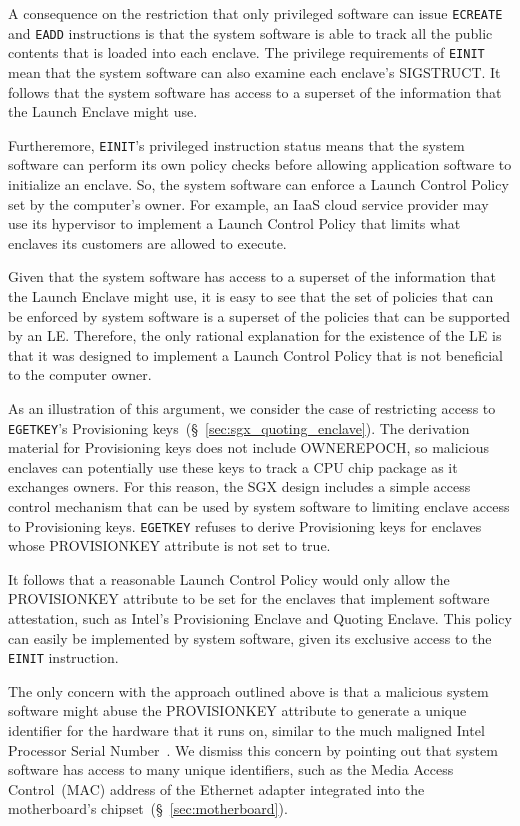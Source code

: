 A consequence on the restriction that only privileged software can issue
\texttt{ECREATE} and \texttt{EADD} instructions is that the system software is
able to track all the public contents that is loaded into each enclave. The
privilege requirements of \texttt{EINIT} mean that the system software can also
examine each enclave's SIGSTRUCT. It follows that the system software has
access to a superset of the information that the Launch Enclave might use.

Furtheremore, \texttt{EINIT}'s privileged instruction status means that the
system software can perform its own policy checks before allowing application
software to initialize an enclave. So, the system software can enforce a Launch
Control Policy set by the computer's owner. For example, an IaaS cloud service
provider may use its hypervisor to implement a Launch Control Policy that
limits what enclaves its customers are allowed to execute.

Given that the system software has access to a superset of the information that
the Launch Enclave might use, it is easy to see that the set of policies that
can be enforced by system software is a superset of the policies that can be
supported by an LE. Therefore, the only rational explanation for the existence
of the LE is that it was designed to implement a Launch Control Policy that is
not beneficial to the computer owner.

As an illustration of this argument, we consider the case of restricting access
to \texttt{EGETKEY}'s Provisioning keys~(\S~\ref{sec:sgx_quoting_enclave}).
The derivation material for Provisioning keys does not include OWNEREPOCH, so
malicious enclaves can potentially use these keys to track a CPU chip package
as it exchanges owners. For this reason, the SGX design includes a simple
access control mechanism that can be used by system software to limiting
enclave access to Provisioning keys. \texttt{EGETKEY} refuses to derive
Provisioning keys for enclaves whose PROVISIONKEY attribute is not set to true.

It follows that a reasonable Launch Control Policy would only allow the
PROVISIONKEY attribute to be set for the enclaves that implement software
attestation, such as Intel's Provisioning Enclave and Quoting Enclave. This
policy can easily be implemented by system software, given its exclusive access
to the \texttt{EINIT} instruction.

The only concern with the approach outlined above is that a malicious system
software might abuse the PROVISIONKEY attribute to generate a unique identifier
for the hardware that it runs on, similar to the much maligned Intel Processor
Serial Number~\cite{intel1999psn}. We dismiss this concern by pointing out that
system software has access to many unique identifiers, such as the
Media Access Control~(MAC) address of the Ethernet adapter integrated into the
motherboard's chipset~(\S~\ref{sec:motherboard}).


